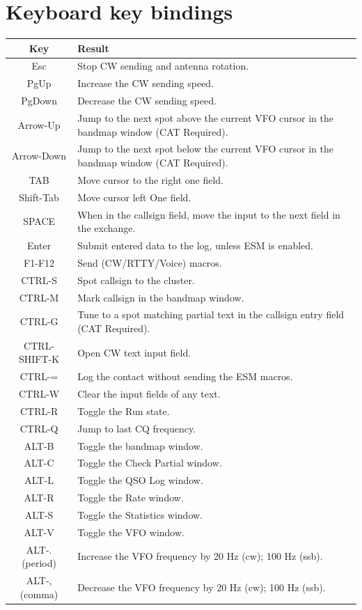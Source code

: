 \documentclass{article}
\begin{document}
\newpage
\section{Keyboard key bindings}
\begin{tabular}{| c | p{9cm} |}
	\hline
	\textbf{Key} & \textbf{Result} \\
	\hline
	Esc & Stop CW sending and antenna rotation.\\
	\hline
	PgUp & Increase the CW sending speed. \\
	\hline
	PgDown & Decrease the CW sending speed. \\
	\hline
	Arrow-Up & Jump to the next spot above the current VFO\index{VFO} cursor in the bandmap window (CAT\index{CAT} Required). \\
	\hline
	Arrow-Down & Jump to the next spot below the current VFO\index{VFO} cursor in the bandmap window (CAT\index{CAT} Required). \\
	\hline
	TAB & Move cursor to the right one field. \\
	\hline
	Shift-Tab & Move cursor left One field. \\
	\hline
	SPACE & When in the callsign field, move the input to the next field in the exchange. \\
	\hline
	Enter & Submit entered data to the log, unless ESM is enabled. \\
	\hline
	F1-F12 & Send (CW/RTTY/Voice) macros. \\
	\hline
	CTRL-S & Spot callsign to the cluster. \\
	\hline
	CTRL-M & Mark callsign in the bandmap window. \\
	\hline
	CTRL-G & Tune to a spot matching partial text in the callsign entry field (CAT\index{CAT} Required). \\
	\hline
	CTRL-SHIFT-K & Open CW text input field. \\
	\hline
	CTRL-= & Log the contact without sending the ESM macros. \\
	\hline
	CTRL-W & Clear the input fields of any text. \\
	\hline
	CTRL-R & Toggle the Run state. \\
	\hline
	CTRL-Q & Jump to last CQ frequency. \\
	\hline
	ALT-B	& Toggle the bandmap window. \\
	\hline
	ALT-C	& Toggle the Check Partial window. \\
	\hline
	ALT-L	& Toggle the QSO Log window. \\
	\hline
	ALT-R	& Toggle the Rate window. \\
	\hline
	ALT-S	& Toggle the Statistics window. \\
	\hline
	ALT-V	& Toggle the VFO\index{VFO} window. \\
	\hline
	ALT-.(period)	& Increase the VFO frequency by 20 Hz (cw); 100 Hz (ssb). \\
	\hline
	ALT-,(comma)	& Decrease the VFO frequency by 20 Hz (cw); 100 Hz (ssb). \\
	\hline
\end{tabular}
\end{document}
